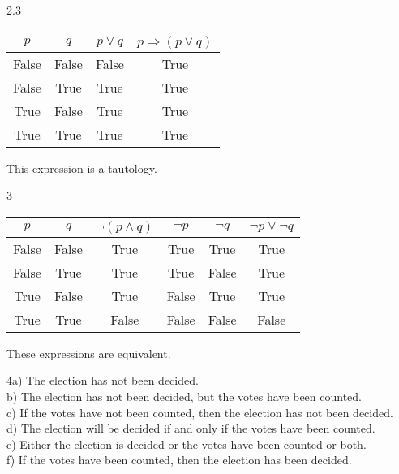 \documentclass{article}
\begin{document}
2.3
\begin{center}
    \begin{tabular}{c c|c||c}
         $p$ & $q$ & \( p \vee q \) & \( p \Longrightarrow (p \vee q) \) \\
         \hline
         False & False & False & True \\
         False & True & True & True \\
         True & False & True & True \\
         True & True & True & True \\
    \end{tabular}
    This expression is a tautology.
\end{center}

\vspace{10mm}
3
\begin{center}
    \begin{tabular}{c c|c||c c|c}
         $p$ & $q$ & \( \neg (p \land q) \) & $\neg p$ & $\neg q$ & \( \neg p \vee \neg q \) \\
         \hline
         False & False & True & True & True & True \\
         False & True & True & True & False & True \\
         True & False & True & False & True & True \\
         True & True & False & False & False & False \\
    \end{tabular}
\end{center}
\begin{center} These expressions are equivalent. \end{center}

\newpage

4a) The election has not been decided. \\

b) The election has not been decided, but the votes have been counted. \\

c) If the votes have not been counted, then the election has not been decided. \\

d) The election will be decided if and only if the votes have been counted. \\

e) Either the election is decided or the votes have been counted or both. \\

f) If the votes have been counted, then the election has been decided. \\
\end{document}
